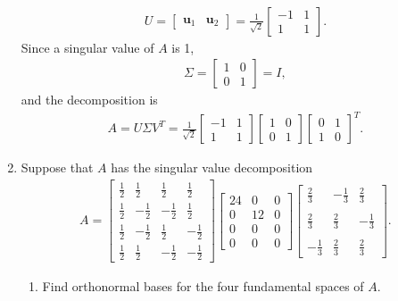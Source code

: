 \documentclass{article}
\begin{document}
\begin{enumerate}
\begin{align*}
	\end{align*}
	\begin{align*}
	U=	\left[\begin{array}{ll}\mathbf{u}_1 &\mathbf{u}_2\end{array} \right]=\frac{1}{\sqrt{2}}\left[\begin{array}{ll} -1&1\\ 1&1\end{array}\right].
	\end{align*}
Since a singular value of $A$ is 1, 
	\begin{align*}
	\Sigma=\left[\begin{array}{ll} 1&0\\0&1\end{array}\right]=I,	
	\end{align*}
and the decomposition is
	\begin{align*}
	A=	U\Sigma V^T=\frac{1}{\sqrt{2}}\left[\begin{array}{ll} -1&1\\ 1&1\end{array}\right]\left[\begin{array}{ll} 1&0\\0&1\end{array}\right]\left[\begin{array}{ll} 0&1\\ 1&0\end{array}\right]^T.
	\end{align*}

\item
Suppose that $A$ has the singular value decomposition
	\begin{align*}
	A=\left[ \begin{array}{rrrr} \frac{1}{2}	&\frac{1}{2}&\frac{1}{2}&\frac{1}{2} \\ \frac{1}{2}&-\frac{1}{2}&-\frac{1}{2}&\frac{1}{2} \\ \frac{1}{2}&-\frac{1}{2}&\frac{1}{2}&-\frac{1}{2} \\ \frac{1}{2}&\frac{1}{2}&-\frac{1}{2}&-\frac{1}{2}\end{array}\right]\left[\begin{array}{lll} 24&0&0 \\ 0&12&0 \\ 0&0&0 \\ 0&0&0 \end{array}\right] \left[\begin{array}{rrr}\frac{2}{3} &-\frac{1}{3} & \frac{2}{3}\\ \\\frac{2}{3} & \frac{2}{3} & -\frac{1}{3} \\\\ -\frac{1}{3} & \frac{2}{3} & \frac{2}{3}\end{array}\right].
	\end{align*}
\begin{enumerate}
\item Find orthonormal bases for the four fundamental spaces of $A$.


\end{enumerate}
\end{enumerate}
\end{document}
